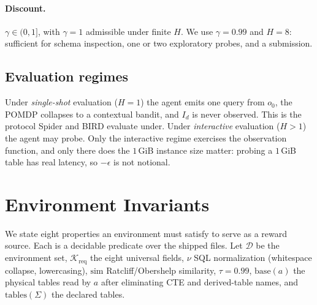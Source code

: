 \documentclass[11pt,letterpaper]{article}
\theoremstyle{definition}
\theoremstyle{plain}
\theoremstyle{remark}
\newcommand{\Dset}{\mathcal{D}}
\newcommand{\Kset}{\mathcal{K}}
\begin{document}
\paragraph{Discount.}
$\gamma \in (0,1]$, with $\gamma = 1$ admissible under finite $H$. We use $\gamma = 0.99$ and
$H = 8$: sufficient for schema inspection, one or two exploratory probes, and a submission.

\subsection{Evaluation regimes}

Under \emph{single-shot} evaluation ($H = 1$) the agent emits one query from $o_0$, the POMDP
collapses to a contextual bandit, and $I_d$ is never observed. This is the protocol Spider and
BIRD evaluate under. Under \emph{interactive} evaluation ($H > 1$) the agent may probe. Only
the interactive regime exercises the observation function, and only there does the $1$\,GiB
instance size matter: probing a $1$\,GiB table has real latency, so $-\epsilon$ is not
notional.

\section{Environment Invariants}
\label{sec:invariants}

We state eight properties an environment must satisfy to serve as a reward source. Each is a
decidable predicate over the shipped files. Let $\Dset$ be the environment set,
$\Kset_{\mathrm{req}}$ the eight universal fields, $\nu$ SQL normalization (whitespace
collapse, lowercasing), $\mathrm{sim}$ Ratcliff/Obershelp similarity, $\tau = 0.99$,
$\mathrm{base}(a)$ the physical tables read by $a$ after eliminating CTE and derived-table
names, and $\mathrm{tables}(\Sigma)$ the declared tables.
\end{document}
